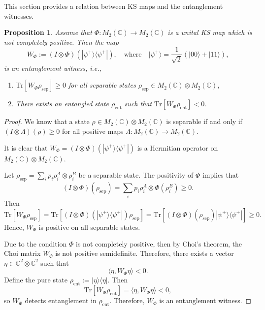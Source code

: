 \documentclass[11pt,reqno]{amsart}
\newtheorem{proposition}[subsection]{Proposition}
\theoremstyle{definition}
\numberwithin{equation}{section} \setcounter{tocdepth}{1}
\numberwithin{equation}{section}
\begin{document}
This section provides a relation between KS maps and the entanglement witnesses.

\begin{proposition}
Assume that $\Phi: M_2(\mathbb{C}) \to M_2(\mathbb{C})$ is a unital KS map which is not completely positive. Then the map
\[
W_\Phi := (I \otimes \Phi)(|\psi^+\rangle\langle\psi^+|), \quad \text{where} \quad |\psi^+\rangle = \frac{1}{\sqrt{2}}(|00\rangle + |11\rangle),
\]
is an \emph{entanglement witness}, i.e.,
\begin{enumerate}
    \item $\mathrm{Tr}[W_\Phi \rho_{\mathrm{sep}}] \geq 0$ for all separable states $\rho_{\mathrm{sep}} \in M_2(\mathbb{C}) \otimes M_2(\mathbb{C})$,
    \item There exists an entangled state $\rho_{\mathrm{ent}}$ such that $\mathrm{Tr}[W_\Phi \rho_{\mathrm{ent}}] < 0$.
\end{enumerate}
\end{proposition}

\begin{proof}
We know that a state $\rho \in M_2(\mathbb{C}) \otimes M_2(\mathbb{C})$ is separable if and only if $(I \otimes \Lambda)(\rho) \geq 0$ for all positive maps $\Lambda: M_2(\mathbb{C}) \to M_2(\mathbb{C})$.

It is clear that $W_\Phi = (I \otimes \Phi)(|\psi^+\rangle\langle\psi^+|)$ is a Hermitian operator on $M_2(\mathbb{C}) \otimes M_2(\mathbb{C})$.

Let $\rho_{\mathrm{sep}} = \sum_i p_i \rho_i^A \otimes \rho_i^B$ be a separable state. The positivity of $\Phi$ implies that
\[
(I \otimes \Phi)(\rho_{\mathrm{sep}}) = \sum_i p_i \rho_i^A \otimes \Phi(\rho_i^B) \geq 0.
\]
Then
\[
\mathrm{Tr}[W_\Phi \rho_{\mathrm{sep}}] = \mathrm{Tr}[(I \otimes \Phi)(|\psi^+\rangle\langle\psi^+|)\rho_{\mathrm{sep}}] = \mathrm{Tr}[(I \otimes \Phi)(\rho_{\mathrm{sep}}) |\psi^+\rangle\langle\psi^+|] \geq 0.
\]
Hence, $W_\Phi$ is positive on all separable states.

Due to the condition $\Phi$ is not completely positive, then by Choi's theorem, the Choi matrix $W_\Phi$ is not positive semidefinite. Therefore, there exists a vector $\eta \in \mathbb{C}^2 \otimes \mathbb{C}^2$ such that
\[
\langle \eta, W_\Phi \eta \rangle < 0.
\]
Define the pure state $\rho_{\mathrm{ent}} := |\eta\rangle\langle\eta|$. Then
\[
\mathrm{Tr}[W_\Phi \rho_{\mathrm{ent}}] = \langle \eta, W_\Phi \eta \rangle < 0,
\]
so $W_\Phi$ detects entanglement in $\rho_{\mathrm{ent}}$. Therefore, $W_\Phi$ is an entanglement witness.

\end{proof}
\end{document}
